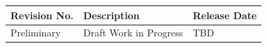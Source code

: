 \documentclass[12pt,oneside,oldfontcommands]{memoir}
\def\releasedate{TBD}
\def\revision{Preliminary  }
\begin{document}
% 
% 
\sffamily
\bfseries
{}
\normalfont
\centering
\begin{table}[htbp]
\begin{minipage}{\linewidth}
\setlength{\tymax}{0.5\linewidth}
\centering
\small
\begin{tabular}{| >{\centering\arraybackslash}m{1.25in}| >{\centering\arraybackslash}m{2.95in}| >{\centering\arraybackslash}m{1.5in}|} \hline
\bfseries{Revision No.} & \bfseries{Description} & \bfseries{Release Date}\\
\hline
Preliminary & Draft Work in Progress & TBD \\
\hline
\end{tabular}
\end{minipage}
\end{table}
% 
\end{document}
